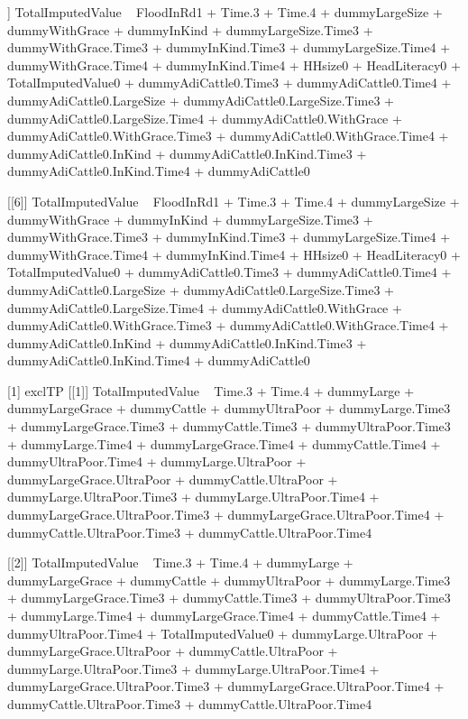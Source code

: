 \begin{Schunk}
\begin{Soutput}
[[5]]
TotalImputedValue ~ FloodInRd1 + Time.3 + Time.4 + dummyLargeSize + 
    dummyWithGrace + dummyInKind + dummyLargeSize.Time3 + dummyWithGrace.Time3 + 
    dummyInKind.Time3 + dummyLargeSize.Time4 + dummyWithGrace.Time4 + 
    dummyInKind.Time4 + HHsize0 + HeadLiteracy0 + TotalImputedValue0 + 
    dummyAdiCattle0.Time3 + dummyAdiCattle0.Time4 + dummyAdiCattle0.LargeSize + 
    dummyAdiCattle0.LargeSize.Time3 + dummyAdiCattle0.LargeSize.Time4 + 
    dummyAdiCattle0.WithGrace + dummyAdiCattle0.WithGrace.Time3 + 
    dummyAdiCattle0.WithGrace.Time4 + dummyAdiCattle0.InKind + 
    dummyAdiCattle0.InKind.Time3 + dummyAdiCattle0.InKind.Time4 + 
    dummyAdiCattle0

[[6]]
TotalImputedValue ~ FloodInRd1 + Time.3 + Time.4 + dummyLargeSize + 
    dummyWithGrace + dummyInKind + dummyLargeSize.Time3 + dummyWithGrace.Time3 + 
    dummyInKind.Time3 + dummyLargeSize.Time4 + dummyWithGrace.Time4 + 
    dummyInKind.Time4 + HHsize0 + HeadLiteracy0 + TotalImputedValue0 + 
    dummyAdiCattle0.Time3 + dummyAdiCattle0.Time4 + dummyAdiCattle0.LargeSize + 
    dummyAdiCattle0.LargeSize.Time3 + dummyAdiCattle0.LargeSize.Time4 + 
    dummyAdiCattle0.WithGrace + dummyAdiCattle0.WithGrace.Time3 + 
    dummyAdiCattle0.WithGrace.Time4 + dummyAdiCattle0.InKind + 
    dummyAdiCattle0.InKind.Time3 + dummyAdiCattle0.InKind.Time4 + 
    dummyAdiCattle0

[1] exclTP
[[1]]
TotalImputedValue ~ Time.3 + Time.4 + dummyLarge + dummyLargeGrace + 
    dummyCattle + dummyUltraPoor + dummyLarge.Time3 + dummyLargeGrace.Time3 + 
    dummyCattle.Time3 + dummyUltraPoor.Time3 + dummyLarge.Time4 + 
    dummyLargeGrace.Time4 + dummyCattle.Time4 + dummyUltraPoor.Time4 + 
    dummyLarge.UltraPoor + dummyLargeGrace.UltraPoor + dummyCattle.UltraPoor + 
    dummyLarge.UltraPoor.Time3 + dummyLarge.UltraPoor.Time4 + 
    dummyLargeGrace.UltraPoor.Time3 + dummyLargeGrace.UltraPoor.Time4 + 
    dummyCattle.UltraPoor.Time3 + dummyCattle.UltraPoor.Time4

[[2]]
TotalImputedValue ~ Time.3 + Time.4 + dummyLarge + dummyLargeGrace + 
    dummyCattle + dummyUltraPoor + dummyLarge.Time3 + dummyLargeGrace.Time3 + 
    dummyCattle.Time3 + dummyUltraPoor.Time3 + dummyLarge.Time4 + 
    dummyLargeGrace.Time4 + dummyCattle.Time4 + dummyUltraPoor.Time4 + 
    TotalImputedValue0 + dummyLarge.UltraPoor + dummyLargeGrace.UltraPoor + 
    dummyCattle.UltraPoor + dummyLarge.UltraPoor.Time3 + dummyLarge.UltraPoor.Time4 + 
    dummyLargeGrace.UltraPoor.Time3 + dummyLargeGrace.UltraPoor.Time4 + 
    dummyCattle.UltraPoor.Time3 + dummyCattle.UltraPoor.Time4


\end{Soutput}
\end{Schunk}

